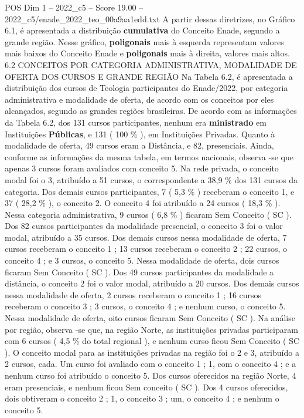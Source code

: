 \begin{textsample}{POS Dim 1 – 2022\_c5 – Score 19.00 – 2022\_c5/enade\_2022\_teo\_00a9aa1edd.txt}
A partir dessas diretrizes, no Gráfico 6.1, é apresentada a distribuição \textbf{cumulativa} do Conceito Enade, segundo a grande região.
Nesse gráfico, \textbf{poligonais} mais à esquerda representam valores mais baixos do Conceito Enade e \textbf{poligonais} mais à direita, valores mais altos. 6.2 CONCEITOS POR CATEGORIA ADMINISTRATIVA, MODALIDADE DE OFERTA DOS CURSOS E GRANDE REGIÃO Na Tabela 6.2, é apresentada a distribuição dos cursos de Teologia participantes do Enade/2022, por categoria administrativa e modalidade de oferta, de acordo com os conceitos por eles alcançados, segundo as grandes regiões brasileiras.
De acordo com as informações da Tabela 6.2, dos 131 cursos participantes, nenhum era \textbf{ministrado} em Instituições \textbf{Públicas}, e 131 ( 100 \% ), em Instituições Privadas.
Quanto à modalidade de oferta, 49 cursos eram a Distância, e 82, presenciais.
Ainda, conforme as informações da mesma tabela, em termos nacionais, observa -se que apenas 3 cursos foram avaliados com conceito 5.
Na rede privada, o conceito modal foi o 3, atribuído a 51 cursos, o correspondente a 38,9 \% dos 131 cursos da categoria.
Dos demais cursos participantes, 7 ( 5,3 \% ) receberam o conceito 1, e 37 ( 28,2 \% ), o conceito 2.
O conceito 4 foi atribuído a 24 cursos ( 18,3 \% ).
Nessa categoria administrativa, 9 cursos ( 6,8 \% ) ficaram Sem Conceito ( SC ).
Dos 82 cursos participantes da modalidade presencial, o conceito 3 foi o valor modal, atribuído a 35 cursos.
Dos demais cursos nessa modalidade de oferta, 7 cursos receberam o conceito 1 ; 13 cursos receberam o conceito 2 ; 22 cursos, o conceito 4 ; e 3 cursos, o conceito 5.
Nessa modalidade de oferta, dois cursos ficaram Sem Conceito ( SC ).
Dos 49 cursos participantes da modalidade a distância, o conceito 2 foi o valor modal, atribuído a 20 cursos.
Dos demais cursos nessa modalidade de oferta, 2 cursos receberam o conceito 1 ; 16 cursos receberam o conceito 3 ; 3 cursos, o conceito 4 ; e nenhum curso, o conceito 5.
Nessa modalidade de oferta, oito cursos ficaram Sem Conceito ( SC ).
Na análise por região, observa -se que, na região Norte, as instituições privadas participaram com 6 cursos ( 4,5 \% do total regional ), e nenhum curso ficou Sem Conceito ( SC ).
O conceito modal para as instituições privadas na região foi o 2 e 3, atribuído a 2 cursos, cada.
Um curso foi avaliado com o conceito 1 ; 1, com o conceito 4 ; e a nenhum curso foi atribuído o conceito 5.
Dos cursos oferecidos na região Norte, 4 eram presenciais, e nenhum ficou Sem conceito ( SC ).
Dos 4 cursos oferecidos, dois obtiveram o conceito 2 ; 1, o conceito 3 ; um, o conceito 4 ; e nenhum o conceito 5.

\end{textsample}
